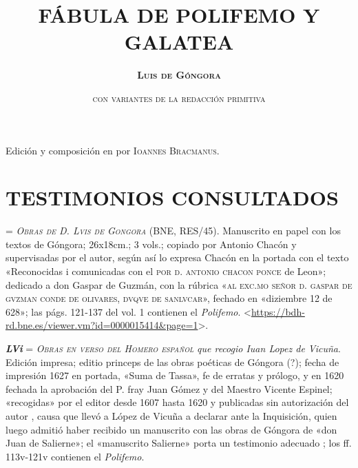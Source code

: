 \documentclass[11pt,twoside]{article}
\title{\huge\textbf{\notoserif FÁBULA DE POLIFEMO Y GALATEA}}
\author{\huge\textsc{\textbf{\notoserif Luis de Góngora}}}
\date{\vspace{60pt}\textsc{\notoserif con variantes de la redacción primitiva}\\\fontsize{60}{11}\selectfont{\vfill\textbf{\texttt{\LaTeX}}}}
\newcommand{\ch}{\emph{\textbf{Ch}}}
\newcommand{\lvi}{\emph{\textbf{LVi}}}
\begin{document}
	{
			\maketitle
		}
		\newpage%
%
\null
\vfill
\begin{flushright}
\small	Edición y composición en \texttt{\XeLaTeX} por \textsc{Ioannes Bracmanus}.
\end{flushright}
\newpage
%
\tableofcontents
\newpage
%
\setcounter{page}{1}
\section*{\raggedleft\textsc{TESTIMONIOS CONSULTADOS}}
%
\noindent{\ch} = \emph{\textsc{Obras de D. Lvis de Gongora}} (BNE, RES/45).
%
Manuscrito en papel con los textos de Góngora; 26x18cm.; 3 vols.; copiado por Antonio Chacón y supervisadas por el autor, según así lo expresa Chacón en la portada con el texto «Reconocidas i comunicadas con el \textsc{por d. antonio chacon ponce} de Leon»; dedicado a don Gaspar de Guzmán, con la rúbrica «\textsc{al exc.mo señor d. gaspar de gvzman conde de olivares, dvqve de sanlvcar}», fechado en «diziembre 12 de 628»; las págs. 121-137 del vol. 1 contienen el \emph{Polifemo}. <\url{https://bdh-rd.bne.es/viewer.vm?id=0000015414\&page=1}>.\par
%
{\lvi} = \emph{\textsc{Obras en verso del Homero español}} \emph{que recogio Iuan Lopez de Vicuña}.
%
Edición impresa; editio princeps de las obras poéticas de Góngora (?); fecha de impresión 1627 en portada, «Suma de Tassa», fe de erratas y prólogo, y en 1620 fechada la aprobación del P. fray Juan Gómez y del Maestro Vicente Espinel; «recogidas» por el editor desde 1607 hasta 1620 y publicadas sin autorización del autor \parencite{Alonso1963}, causa que llevó a López de Vicuña a declarar ante la Inquisición, quien luego admitió haber recibido un manuscrito con las obras de Góngora de «don Juan de Salierne»; el «manuscrito Salierne» porta un testimonio adecuado \parencite{Alonso1963}; los ff. 113v-121v contienen el \emph{Polifemo}.\par
\end{document}
